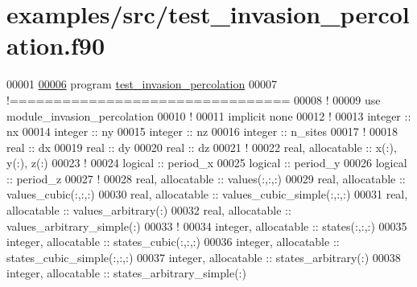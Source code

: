 \hypertarget{test__invasion__percolation_8f90_source}{
\section{examples/src/test\-\_\-invasion\-\_\-percolation.f90}
}

\begin{DoxyCode}
00001 
\hypertarget{test__invasion__percolation_8f90_source_l00006}{}\hyperlink{test__invasion__percolation_8f90_ad5c91e8965b4fdd846307042d97f5d65}{00006} \textcolor{keyword}{program} \hyperlink{test__invasion__percolation_8f90_ad5c91e8965b4fdd846307042d97f5d65}{test_invasion_percolation}
00007 \textcolor{comment}{!================================}
00008 \textcolor{comment}{!}
00009 use \textcolor{keywordflow}{module\_invasion\_percolation}
00010 \textcolor{comment}{!}
00011 \textcolor{keyword}{implicit none}
00012 \textcolor{comment}{!}
00013 \textcolor{keywordtype}{integer} :: nx
00014 \textcolor{keywordtype}{integer} :: ny
00015 \textcolor{keywordtype}{integer} :: nz
00016 \textcolor{keywordtype}{integer} :: n\_sites
00017 \textcolor{comment}{!}
00018 \textcolor{keywordtype}{real} :: dx 
00019 \textcolor{keywordtype}{real} :: dy 
00020 \textcolor{keywordtype}{real} :: dz 
00021 \textcolor{comment}{!}
00022 \textcolor{keywordtype}{real}, \textcolor{keywordtype}{allocatable} :: x(:), y(:), z(:)
00023 \textcolor{comment}{!}
00024 \textcolor{keywordtype}{logical} :: period\_x 
00025 \textcolor{keywordtype}{logical} :: period\_y
00026 \textcolor{keywordtype}{logical} :: period\_z 
00027 \textcolor{comment}{!}
00028 \textcolor{keywordtype}{real}, \textcolor{keywordtype}{allocatable} :: values(:,:,:) 
00029 \textcolor{keywordtype}{real}, \textcolor{keywordtype}{allocatable} :: values\_cubic(:,:,:) 
00030 \textcolor{keywordtype}{real}, \textcolor{keywordtype}{allocatable} :: values\_cubic\_simple(:,:,:) 
00031 \textcolor{keywordtype}{real}, \textcolor{keywordtype}{allocatable} :: values\_arbitrary(:) 
00032 \textcolor{keywordtype}{real}, \textcolor{keywordtype}{allocatable} :: values\_arbitrary\_simple(:) 
00033 \textcolor{comment}{!}
00034 \textcolor{keywordtype}{integer}, \textcolor{keywordtype}{allocatable} :: states(:,:,:) 
00035 \textcolor{keywordtype}{integer}, \textcolor{keywordtype}{allocatable} :: states\_cubic(:,:,:) 
00036 \textcolor{keywordtype}{integer}, \textcolor{keywordtype}{allocatable} :: states\_cubic\_simple(:,:,:) 
00037 \textcolor{keywordtype}{integer}, \textcolor{keywordtype}{allocatable} :: states\_arbitrary(:) 
00038 \textcolor{keywordtype}{integer}, \textcolor{keywordtype}{allocatable} :: states\_arbitrary\_simple(:) 

\end{DoxyCode}
